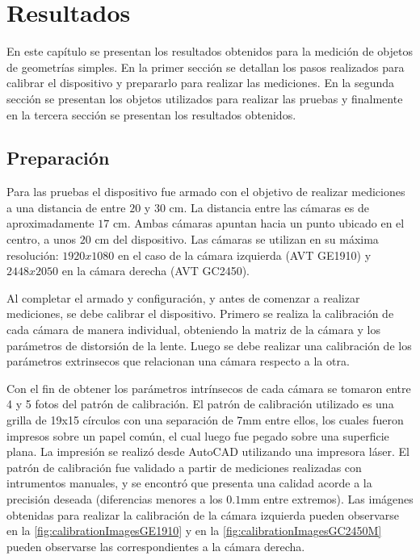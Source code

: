\chapter{Resultados}\label{ch:resultados}

En este capítulo se presentan los resultados obtenidos para la medición de objetos de geometrías simples. En la primer sección se detallan los pasos realizados para calibrar el dispositivo y prepararlo para realizar las mediciones. En la segunda sección se presentan los objetos utilizados para realizar las pruebas y finalmente en la tercera sección se presentan los resultados obtenidos.

\section{Preparación}
Para las pruebas el dispositivo fue armado con el objetivo de realizar mediciones a una distancia de entre $20$ y $30$ cm. La distancia entre las cámaras es de aproximadamente $17$ cm. Ambas cámaras apuntan hacia un punto ubicado en el centro, a unos $20$ cm del dispositivo. Las cámaras se utilizan en su máxima resolución: $1920x1080$ en el caso de la cámara izquierda (AVT GE1910) y $2448x2050$ en la cámara derecha (AVT GC2450).

Al completar el armado y configuración, y antes de comenzar a realizar mediciones, se debe calibrar el dispositivo. Primero se realiza la calibración de cada cámara de manera individual, obteniendo la matriz de la cámara y los parámetros de distorsión de la lente. Luego se debe realizar una calibración de los parámetros extrinsecos que relacionan una cámara respecto a la otra. 

Con el fin de obtener los parámetros intrínsecos de cada cámara se tomaron entre 4 y 5 fotos del patrón de calibración. El patrón de calibración utilizado es una grilla de 19x15 círculos con una separación de 7mm entre ellos, los cuales fueron impresos sobre un papel común, el cual luego fue pegado sobre una superficie plana. La impresión se realizó desde AutoCAD utilizando una impresora láser. El patrón de calibración fue validado a partir de mediciones realizadas con intrumentos manuales, y se encontró que presenta una calidad acorde a la precisión deseada (diferencias menores a los $0.1$mm entre extremos). Las imágenes obtenidas para realizar la calibración de la cámara izquierda pueden observarse en la \autoref{fig:calibrationImagesGE1910} y en la \autoref{fig:calibrationImagesGC2450M} pueden observarse las correspondientes a la cámara derecha.

